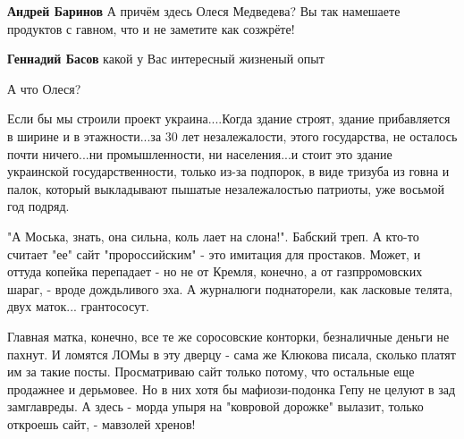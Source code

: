 \begin{itemize}
\begin{itemize}
\textbf{Андрей Баринов} А причём здесь Олеся Медведева? Вы так намешаете продуктов с гавном, что и не заметите как созжрёте!

 
\textbf{Геннадий Басов} какой у Вас интересный жизненый опыт

 
А что Олеся?
\end{itemize}

 

Если бы мы строили проект украина....Когда здание строят, здание прибавляется в
ширине и в этажности...за 30 лет незалежалости, этого государства, не осталось
почти ничего...ни промышленности, ни населения...и стоит это здание украинской
государственности, только из-за подпорок, в виде тризуба из говна и палок,
который выкладывают пышатые незалежалостью патриоты, уже восьмой год подряд.


 

"А Моська, знать, она сильна, коль лает на слона!". Бабский треп. А кто-то
считает "ее" сайт "пророссийским" - это имитация для простаков. Может, и оттуда
копейка перепадает - но не от Кремля, конечно, а от газпрромовских шараг, -
вроде дождьливого эха. А журналюги поднаторели, как ласковые телята, двух
маток... грантососут. 

Главная матка, конечно, все те же соросовские конторки, безналичные деньги не
пахнут. И ломятся ЛОМы в эту дверцу - сама же Клюкова писала, сколько платят им
за такие посты. Просматриваю сайт только потому, что остальные еще продажнее и
дерьмовее. Но в них хотя бы мафиози-подонка Гепу не целуют в зад замглавреды. А
здесь - морда упыря на "ковровой дорожке" вылазит, только откроешь сайт, -
мавзолей хренов!


\end{itemize}
